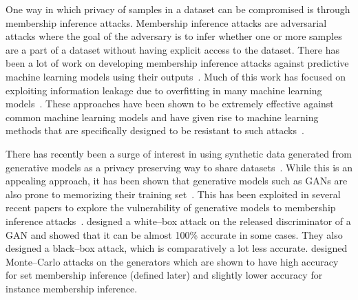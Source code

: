 \documentclass{article}
\begin{document}
One way in which privacy of samples in a dataset can be compromised is through membership inference attacks. Membership inference attacks are adversarial attacks where the goal of the adversary is to infer whether one or more samples are a part of a dataset without having explicit access to the dataset. There has been a lot of work on developing membership inference attacks against predictive machine learning models using their outputs~\cite{shokri2017membership, long2018understanding, song2019membership, truex2019demystifying}. Much of this work has focused on exploiting information leakage due to overfitting in many machine learning models~\cite{yeom2018privacy}. These approaches have been shown to be extremely effective against common machine learning models and have given rise to machine learning methods that are specifically designed to be resistant to such attacks~\cite{nasr2018machine, jia2019memguard,li2020membership,salem2018ml}. 


There has recently been a surge of interest in using synthetic data generated from generative models as a privacy preserving way to share datasets~\cite{han2018gan,yi2019generative,zheng2018detection}. While this is an appealing approach, it has been shown that generative models such as GANs are also prone to memorizing their training set~\cite{liu2018generative}. This has been exploited in several recent papers to explore the vulnerability of generative models to membership inference attacks~\cite{hayes2019logan,chen2019gan,hilprecht2019monte}. \cite{hayes2019logan} designed a white--box attack on the released discriminator of a GAN and showed that it can be almost 100\% accurate in some cases. They also designed a black--box attack, which is comparatively a lot less accurate.  \cite{hilprecht2019monte} designed Monte--Carlo attacks on the generators which are shown to have high accuracy for set membership inference (defined later) and slightly lower accuracy for instance membership inference. 
\end{document}
